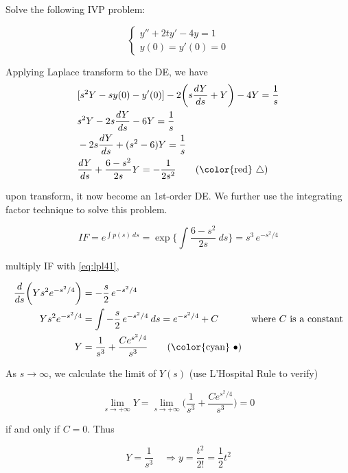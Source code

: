 \begin{example}
    Solve the following IVP problem:
    
    \[
        \begin{cases}
            y'' + 2ty' - 4y = 1\\
            y(0) = y'(0) = 0
        \end{cases}
    \]
\end{example}
\begin{solution}
    Applying Laplace transform to the DE, we have
    \begin{align*}
        &[s^2Y - sy(0) - y'(0)] - 2\biggl(s\frac{dY}{ds} + Y \biggr) - 4Y = \frac{1}{s}\\
        &s^2Y - 2s\frac{dY}{ds} - 6Y = \frac{1}{s}\\
        &-2s \frac{dY}{ds} + (s^2 - 6)Y = \frac{1}{s}\\
        &\frac{dY}{ds} + \frac{6-s^2}{2s} Y = - \frac{1}{2s^2} \label{eq:lpl41} \tag{{\color{red} $\bigtriangleup$}}
    \end{align*}

    upon transform, it now become an 1st-order DE. We further use the integrating factor technique 
    to solve this problem.

    \[
    IF = e^{\int p(s)\> ds} = \exp \biggl\{\int \frac{6 - s^2}{2s}\> ds \biggr\} = s^3\, e^{-s^2/4}
    \]

    multiply IF with \eqref{eq:lpl41},

    \begin{align*}
        \frac{d}{ds} \biggl(Ys^2 e^{-s^2/4}\biggr) &= -\frac{s}{2}\, e^{-s^2/4}\\
        Ys^2 e^{-s^2/4} &= \int -\frac{s}{2}\, e^{-s^2/4} \> ds = e^{-s^2/4} + C & \text{where } C \text{ is a constant}\\
        Y &= \frac{1}{s^3} + \frac{Ce^{s^2/4}}{s^3} \label{eq:lpl41b} \tag{{\color{cyan} $\bullet$}}
    \end{align*}

    As $s \to \infty$, we calculate the limit of $Y(s)$ (use L'Hospital Rule to verify)

    \[
        \lim_{s \to +\infty} Y = \lim_{s \to +\infty} \biggl(\frac{1}{s^3} + \frac{Ce^{s^2/4}}{s^3}\biggr) = 0
    \]

    if and only if $C = 0$. Thus

    \[
        Y = \frac{1}{s^3} \quad \Rightarrow y = \frac{t^2}{2!} = \frac{1}{2}t^2
    \]

\end{solution}


